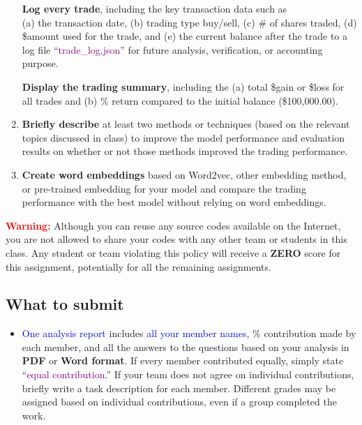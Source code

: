 \documentclass[twocolumn,10pt]{article}
\begin{document}
\begin{multicols}{2}
\begin{flushleft}
\begin{enumerate}
	\textbf{Log every trade}, including the key transaction data such as\\
		\subitem (a) the transaction date, 
		\subitem (b) trading type buy/sell, 
		\subitem (c) \# of shares traded, 
		\subitem (d) \$amount used for the trade, and 
		\subitem (e) the current balance after the trade to a log file \enquote{\textcolor{purple}{trade\_log.json}} for future analysis, verification, or accounting purpose.
		
	\textbf{Display the trading summary}, including the 
		\subitem (a) total \$gain or \$loss for all trades and
		\subitem (b) \% return compared to the initial balance (\$100,000.00).

	\item \textbf{Briefly describe} at least two methods or techniques (based on the relevant topics discussed in class) to improve the model performance and evaluation results on whether or not those methods improved the trading performance.
	
	\item \textbf{Create word embeddings} based on Word2vec, other embedding method, or pre-trained embedding for your model and compare the trading performance with the best model without relying on word embeddings.
\end{enumerate}

\textcolor{red}{\textbf{Warning:}} Although you can reuse any source codes available on the Internet, you are not allowed to share your codes with any other team or students in this class. Any student or team violating this policy will receive a \textbf{ZERO} score for this assignment, potentially for all the remaining assignments.

\subsection*{What to submit}
\begin{itemize}
	\item \textcolor{blue}{One analysis report} includes \textcolor{blue}{all your member names}, \% contribution made by each member, and all the answers to the questions based on your analysis in \textbf{PDF} or \textbf{Word format}. If every member contributed equally, simply state \enquote{\textcolor{purple}{equal contribution}.} If your team does not agree on individual contributions, briefly write a task description for each member. Different grades may be assigned based on individual contributions, even if a group completed the work.
	

\end{itemize}
\end{flushleft}
\end{multicols}
\end{document}

